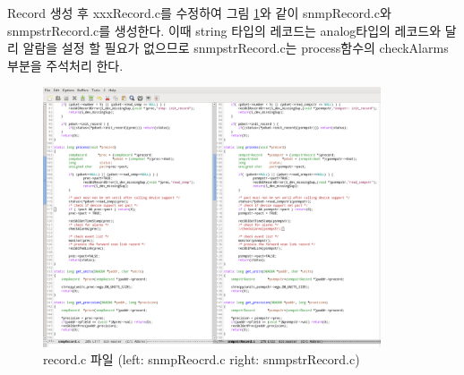 \documentclass[11pt
  , a4paper
  , article
  , oneside
]{memoir}
\begin{document}
Record 생성 후 xxxRecord.c를 수정하여 그림 \ref{fig:recordc}와 같이 snmpRecord.c와 snmpstrRecord.c를 생성한다. 이때 string 타입의 레코드는 analog타입의 레코드와 달리 알람을 설정 할 필요가 없으므로 snmpstrRecord.c는 process함수의 checkAlarms부분을 주석처리 한다. 

\begin{figure}[h!]
  \centering
  \includegraphics[width=0.89\textwidth]{./images/recordc.eps}
  \caption{record.c 파일 (left: snmpReocrd.c right: snmpstrRecord.c)}
  \label{fig:recordc}   
\end{figure}
\end{document}
